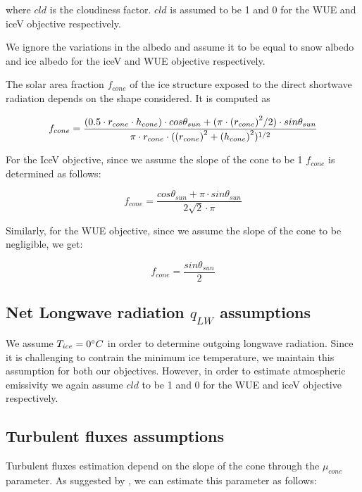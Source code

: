 \documentclass[tc, manuscript]{copernicus}
\begin{document}
where $cld$ is the cloudiness factor. $cld$ is assumed to be 1 and 0 for the WUE and iceV objective
respectively.

We ignore the variations in the albedo and assume it to be equal to snow albedo and ice albedo for the iceV and
WUE objective respectively. 

The solar area fraction $f_{cone}$ of the ice structure exposed to the direct shortwave radiation depends on the
shape considered. It is computed as

\begin{equation}
		f_{cone} =\frac{(0.5 \cdot r_{cone} \cdot h_{cone}) \cdot cos \theta_{sun} +(\pi \cdot
			{(r_{cone})}^2/2) \cdot sin \theta_{sun} }{\pi \cdot r_{cone} \cdot ({(r_{cone})}^2+{(h_{cone})}^2)^{1/2}}\\
\end{equation}

For the IceV objective, since we assume the slope of the cone to be 1 $f_{cone}$ is determined
as follows:

\begin{equation}
		f_{cone} =\frac{ cos \theta_{sun} + \pi \cdot sin \theta_{sun} }{2\sqrt{2} \cdot \pi }
\end{equation}

Similarly, for the WUE objective, since we assume the slope of the cone to be negligible, we get:

\begin{equation}
		f_{cone} =\frac{ sin \theta_{sun} }{2 }
\end{equation}


\subsection{Net Longwave radiation \texorpdfstring{$q_{LW}$}{Lg} assumptions} \label{sec:LW}


We assume $T_{ice} = 0 ^{\circ} C$ in order to determine outgoing longwave radiation. Since it is challenging to
contrain the minimum ice temperature, we maintain this assumption for both our objectives. However, in order to
estimate atmospheric emissivity we again assume $cld$ to be 1 and 0 for the WUE and iceV objective respectively.

\subsection{Turbulent fluxes assumptions} \label{sec:Qs}

Turbulent fluxes estimation depend on the slope of the cone through the $\mu_{cone}$ parameter. As suggested 
by \citet{oerlemansBriefCommunicationGrowth2021}, we can estimate this parameter as follows:
\end{document}
